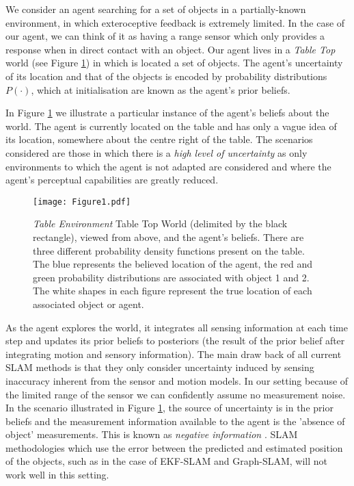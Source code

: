 \documentclass[review]{elsarticle}
\numberwithin{equation}{section}
\begin{document}
We consider an agent searching for a set of objects in a partially-known environment, in which exteroceptive feedback is extremely limited.
In the case of our agent, we can think of it as having a range sensor which only provides a response when in direct contact with an object. 
Our agent lives in a \textit{Table Top} world (see Figure \ref{fig:Figure1}) in which is located a set of objects.
The agent's uncertainty of its location and that of the objects is encoded by probability distributions $P(\cdot)$, which 
at initialisation are known as the agent's prior beliefs.

In Figure \ref{fig:Figure1} we illustrate a particular instance of the agent's beliefs about the world. 
The agent is currently located on the table and has only a vague idea of its location, somewhere about the centre right of the table. 
The scenarios considered are those in which there is a \textit{high level of uncertainty} as only environments to which the agent is not adapted are considered
and where the agent's perceptual capabilities are greatly reduced.

\begin{figure}
  \centering
  \texttt{[image: Figure1.pdf]}
  \caption{ \textit{Table Environment} Table Top World (delimited by the black rectangle), viewed from above, and the agent's beliefs. 
  There are three different probability density functions present on the table. 
  The blue represents the believed location of the agent, the red and green probability distributions are associated with object 1 and 2.
  The white shapes in each figure represent the true location of each associated object or agent.}
  \label{fig:Figure1}
\end{figure}
\vspace*{0.6cm}

As the agent explores the world, it integrates all sensing information at each time step and updates its prior beliefs to posteriors
(the result of the prior belief after integrating motion and sensory information).
The main draw back of all current SLAM methods is that they only consider uncertainty induced by sensing inaccuracy inherent from 
the sensor and motion models. In our setting because of 
the limited range of the sensor we can confidently assume no measurement noise. 
In the scenario illustrated in Figure \ref{fig:Figure1}, the source of uncertainty is in the prior 
beliefs and the measurement information available to the agent is the 'absence of object' measurements. 
This is known as \textit{negative information} \cite[p.313]{Thrun_Burgard_Fox_2005}\cite{Thrun02particlefilters,negative_info_markov_localisation}. 
SLAM methodologies which use the error between the predicted and estimated position of the objects, such as in the case 
of EKF-SLAM and Graph-SLAM, will not work well in this setting. 
\end{document}
